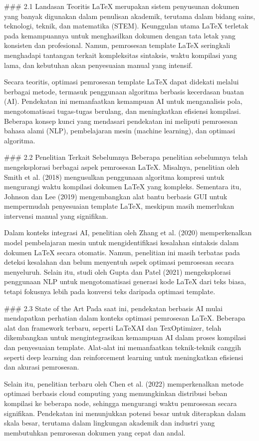 \documentclass{elsarticle}
\begin{document}
### 2.1 Landasan Teoritis  
LaTeX merupakan sistem penyusunan dokumen yang banyak digunakan dalam penulisan akademik, terutama dalam bidang sains, teknologi, teknik, dan matematika (STEM). Keunggulan utama LaTeX terletak pada kemampuannya untuk menghasilkan dokumen dengan tata letak yang konsisten dan profesional. Namun, pemrosesan template LaTeX seringkali menghadapi tantangan terkait kompleksitas sintaksis, waktu kompilasi yang lama, dan kebutuhan akan penyesuaian manual yang intensif.  

Secara teoritis, optimasi pemrosesan template LaTeX dapat didekati melalui berbagai metode, termasuk penggunaan algoritma berbasis kecerdasan buatan (AI). Pendekatan ini memanfaatkan kemampuan AI untuk menganalisis pola, mengotomatisasi tugas-tugas berulang, dan meningkatkan efisiensi kompilasi. Beberapa konsep kunci yang mendasari pendekatan ini meliputi pemrosesan bahasa alami (NLP), pembelajaran mesin (machine learning), dan optimasi algoritma.  

### 2.2 Penelitian Terkait Sebelumnya  
Beberapa penelitian sebelumnya telah mengeksplorasi berbagai aspek pemrosesan LaTeX. Misalnya, penelitian oleh Smith et al. (2018) mengusulkan penggunaan algoritma kompresi untuk mengurangi waktu kompilasi dokumen LaTeX yang kompleks. Sementara itu, Johnson dan Lee (2019) mengembangkan alat bantu berbasis GUI untuk mempermudah penyesuaian template LaTeX, meskipun masih memerlukan intervensi manual yang signifikan.  

Dalam konteks integrasi AI, penelitian oleh Zhang et al. (2020) memperkenalkan model pembelajaran mesin untuk mengidentifikasi kesalahan sintaksis dalam dokumen LaTeX secara otomatis. Namun, penelitian ini masih terbatas pada deteksi kesalahan dan belum menyentuh aspek optimasi pemrosesan secara menyeluruh. Selain itu, studi oleh Gupta dan Patel (2021) mengeksplorasi penggunaan NLP untuk mengotomatisasi generasi kode LaTeX dari teks biasa, tetapi fokusnya lebih pada konversi teks daripada optimasi template.  

### 2.3 State of the Art  
Pada saat ini, pendekatan berbasis AI mulai mendapatkan perhatian dalam konteks optimasi pemrosesan LaTeX. Beberapa alat dan framework terbaru, seperti LaTeXAI dan TexOptimizer, telah dikembangkan untuk mengintegrasikan kemampuan AI dalam proses kompilasi dan penyesuaian template. Alat-alat ini memanfaatkan teknik-teknik canggih seperti deep learning dan reinforcement learning untuk meningkatkan efisiensi dan akurasi pemrosesan.  

Selain itu, penelitian terbaru oleh Chen et al. (2022) memperkenalkan metode optimasi berbasis cloud computing yang memungkinkan distribusi beban kompilasi ke beberapa node, sehingga mengurangi waktu pemrosesan secara signifikan. Pendekatan ini menunjukkan potensi besar untuk diterapkan dalam skala besar, terutama dalam lingkungan akademik dan industri yang membutuhkan pemrosesan dokumen yang cepat dan andal.  
\end{document}
